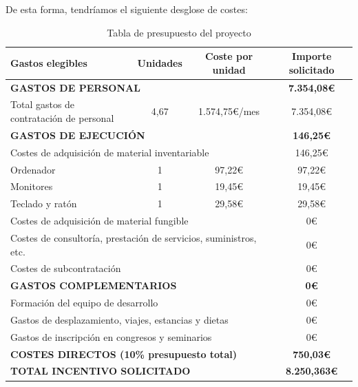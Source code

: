 De esta forma, tendríamos el siguiente desglose de costes:
\begin{table}[H]
    \caption{Tabla de presupuesto del proyecto}\label{tab:presupuesto}
    \begin{center}
        \begin{tabularx}{\textwidth}{|X|c|c|c|}
            \hline
            \textbf{Gastos elegibles} & \textbf{Unidades} & \textbf{Coste por unidad} & \textbf{Importe solicitado} \\
            \hline
            \multicolumn{3}{|l|}{\textbf{GASTOS DE PERSONAL}} & \textbf{7.354,08\euro} \\
            Total gastos de contratación de personal & 4,67 & 1.574,75\euro/mes & 7.354,08\euro \\
            \hline
            \multicolumn{3}{|l|}{\textbf{GASTOS DE EJECUCIÓN}} & \textbf{146,25\euro} \\
            \multicolumn{3}{|l|}{Costes de adquisición de material inventariable} & 146,25\euro \\
            \quad Ordenador & 1 & 97,22\euro & 97,22\euro \\
            \quad Monitores & 1 & 19,45\euro & 19,45\euro \\
            \quad Teclado y ratón & 1 & 29,58\euro & 29,58\euro \\
            \multicolumn{3}{|l|}{Costes de adquisición de material fungible} & 0\euro \\
            \multicolumn{3}{|l|}{Costes de consultoría, prestación de servicios, suministros, etc.} & 0\euro \\
            \multicolumn{3}{|l|}{Costes de subcontratación} & 0\euro \\
            \multicolumn{3}{|l|}{\textbf{GASTOS COMPLEMENTARIOS}} & \textbf{0\euro} \\
            \multicolumn{3}{|l|}{Formación del equipo de desarrollo} & 0\euro \\
            \multicolumn{3}{|l|}{Gastos de desplazamiento, viajes, estancias y dietas} & 0\euro \\
            \multicolumn{3}{|l|}{Gastos de inscripción en congresos y seminarios} & 0\euro \\
            \hline
            \multicolumn{3}{|l|}{\textbf{COSTES DIRECTOS (10\% presupuesto total)}} & \textbf{750,03\euro} \\
            \hline
            \multicolumn{3}{|l|}{\textbf{TOTAL INCENTIVO SOLICITADO}} & \textbf{8.250,363\euro} \\
            \hline
        \end{tabularx}
    \end{center}
\end{table}



